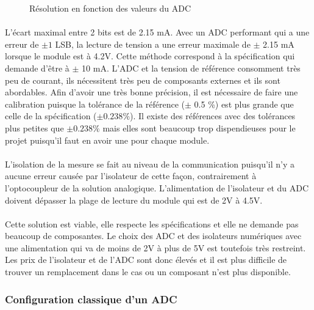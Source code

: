 \begin{figure}[H]
\begin{minipage}{0.45\textwidth}
			\caption{Résolution en fonction des valeurs du ADC}
			\label{fig:res_vref}
		\end{minipage}
	\end{figure}

	\paragraph*{}
	L'écart maximal entre 2 bits est de 2.15 mA. Avec un ADC performant qui a une erreur de $\pm 1$ LSB, la lecture de tension a une erreur maximale de $\pm $ 2.15 mA lorsque le module est à 4.2V. Cette méthode correspond à la spécification qui demande d'être à $\pm $ 10 mA. L'ADC et la tension de référence consomment très peu de courant, ils nécessitent très peu de composants externes et ils sont abordables. Afin d'avoir une très bonne précision, il est nécessaire de faire une calibration puisque la tolérance de la référence ($\pm$ 0.5 \%) est plus grande que celle de la spécification ($\pm 0.238 \%$). Il existe des références avec des tolérances plus petites que $\pm 0.238 \%$ mais elles sont beaucoup trop dispendieuses pour le projet puisqu'il faut en avoir une pour chaque module.

	\paragraph*{}
	L'isolation de la mesure se fait au niveau de la communication puisqu'il n'y a aucune erreur causée par l'isolateur de cette façon, contrairement à l'optocoupleur de la solution analogique. L'alimentation de l'isolateur et du ADC doivent dépasser la plage de lecture du module qui est de 2V à 4.5V.

	\paragraph*{}
	Cette solution est viable, elle respecte les spécifications et elle ne demande pas beaucoup de composantes. Le choix des ADC et des isolateurs numériques avec une alimentation qui va de moins de 2V à plus de 5V est toutefois très restreint. Les prix de l'isolateur et de l'ADC sont donc élevés et il est plus difficile de trouver un remplacement dans le cas ou un composant n'est plus disponible.

	\subsubsection*{Configuration classique d'un ADC}
